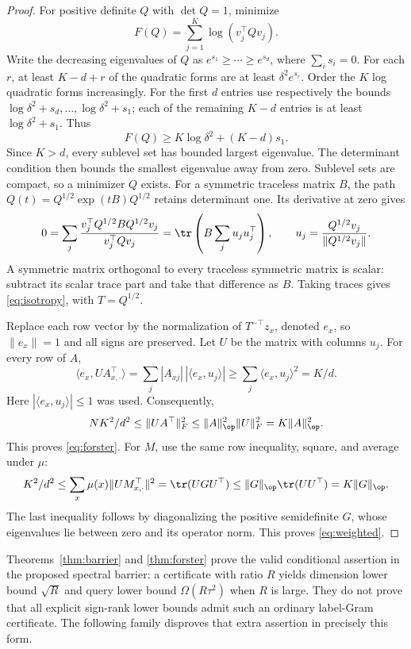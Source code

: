 \begin{proof}
For positive definite $Q$ with $\det Q=1$, minimize
\[
 F(Q)=\sum_{j=1}^K\log(v_j^\top Qv_j).
\]
Write the decreasing eigenvalues of $Q$ as $e^{s_1}\geq\cdots\geq e^{s_d}$, where $\sum_i s_i=0$. For each $r$, at least $K-d+r$ of the quadratic forms are at least $\delta^2e^{s_r}$. Order the $K$ log quadratic forms increasingly. For the first $d$ entries use respectively the bounds
$\log\delta^2+s_d,\ldots,\log\delta^2+s_1$; each of the remaining $K-d$ entries is at least $\log\delta^2+s_1$. Thus
\[
 F(Q)\geq K\log\delta^2+(K-d)s_1.
\]
Since $K>d$, every sublevel set has bounded largest eigenvalue. The determinant condition then bounds the smallest eigenvalue away from zero. Sublevel sets are compact, so a minimizer $Q$ exists.
For a symmetric traceless matrix $B$, the path
$Q(t)=Q^{1/2}\exp(tB)Q^{1/2}$ retains determinant one. Its derivative at zero gives
\[
 0=\sum_j\frac{v_j^\top Q^{1/2}BQ^{1/2}v_j}{v_j^\top Qv_j}
   =\tr\left(B\sum_j u_ju_j^\top\right),
 \qquad u_j=\frac{Q^{1/2}v_j}{\|Q^{1/2}v_j\|}.
\]
A symmetric matrix orthogonal to every traceless symmetric matrix is scalar: subtract its scalar trace part and take that difference as $B$. Taking traces gives \eqref{eq:isotropy}, with $T=Q^{1/2}$.

Replace each row vector by the normalization of $T^{-\top}z_x$, denoted $e_x$, so $\|e_x\|=1$ and all signs are preserved. Let $U$ be the matrix with columns $u_j$. For every row of $A$,
\[
 \langle e_x,UA_{x,\cdot}^{\top}\rangle
 =\sum_j |A_{xj}|\,|\langle e_x,u_j\rangle|
 \geq\sum_j\langle e_x,u_j\rangle^2=K/d.
\]
Here $|\langle e_x,u_j\rangle|\leq1$ was used. Consequently,
\[
 NK^2/d^2\leq\|UA^\top\|_F^2
 \leq\|A\|_\op^2\|U\|_F^2=K\|A\|_\op^2.
\]
This proves \eqref{eq:forster}. For $M$, use the same row inequality, square, and average under $\mu$:
\[
 K^2/d^2\leq\sum_x\mu(x)\|UM_{x,\cdot}^{\top}\|^2
 =\tr(UGU^\top)\leq\|G\|_\op\tr(UU^\top)=K\|G\|_\op.
\]
The last inequality follows by diagonalizing the positive semidefinite $G$, whose eigenvalues lie between zero and its operator norm. This proves \eqref{eq:weighted}.
\end{proof}

Theorems~\ref{thm:barrier} and \ref{thm:forster} prove the valid conditional assertion in the proposed spectral barrier: a certificate with ratio $R$ yields dimension lower bound $\sqrt R$ and query lower bound $\Omega(R\tau^2)$ when $R$ is large. They do not prove that all explicit sign-rank lower bounds admit such an ordinary label-Gram certificate. The following family disproves that extra assertion in precisely this form.

